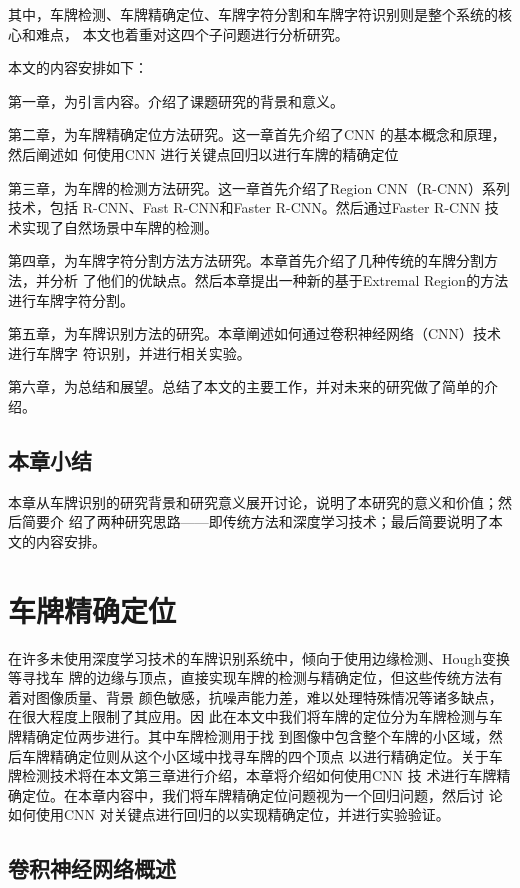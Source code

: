 其中，车牌检测、车牌精确定位、车牌字符分割和车牌字符识别则是整个系统的核心和难点，
本文也着重对这四个子问题进行分析研究。

本文的内容安排如下：

第一章，为引言内容。介绍了课题研究的背景和意义。

第二章，为车牌精确定位方法研究。这一章首先介绍了CNN 的基本概念和原理，然后阐述如
何使用CNN 进行关键点回归以进行车牌的精确定位

第三章，为车牌的检测方法研究。这一章首先介绍了Region CNN（R-CNN）系列技术，包括
R-CNN、Fast R-CNN和Faster R-CNN。然后通过Faster R-CNN 技术实现了自然场景中车牌的检测。

第四章，为车牌字符分割方法方法研究。本章首先介绍了几种传统的车牌分割方法，并分析
了他们的优缺点。然后本章提出一种新的基于Extremal Region的方法进行车牌字符分割。

第五章，为车牌识别方法的研究。本章阐述如何通过卷积神经网络（CNN）技术进行车牌字
符识别，并进行相关实验。

第六章，为总结和展望。总结了本文的主要工作，并对未来的研究做了简单的介绍。

\section{本章小结}

本章从车牌识别的研究背景和研究意义展开讨论，说明了本研究的意义和价值；然后简要介
绍了两种研究思路——即传统方法和深度学习技术；最后简要说明了本文的内容安排。

\chapter{车牌精确定位}

在许多未使用深度学习技术的车牌识别系统中，倾向于使用边缘检测、Hough变换等寻找车
牌的边缘与顶点，直接实现车牌的检测与精确定位，但这些传统方法有着对图像质量、背景
颜色敏感，抗噪声能力差，难以处理特殊情况等诸多缺点，在很大程度上限制了其应用。因
此在本文中我们将车牌的定位分为车牌检测与车牌精确定位两步进行。其中车牌检测用于找
到图像中包含整个车牌的小区域，然后车牌精确定位则从这个小区域中找寻车牌的四个顶点
以进行精确定位。关于车牌检测技术将在本文第三章进行介绍，本章将介绍如何使用CNN 技
术进行车牌精确定位。在本章内容中，我们将车牌精确定位问题视为一个回归问题，然后讨
论如何使用CNN 对关键点进行回归的以实现精确定位，并进行实验验证。

\section{卷积神经网络概述}

